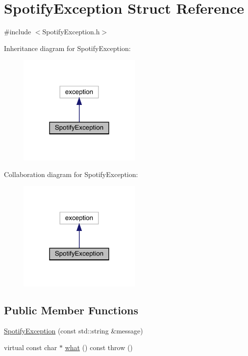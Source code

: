 \hypertarget{struct_spotify_exception}{}\section{Spotify\+Exception Struct Reference}
\label{struct_spotify_exception}


{\ttfamily \#include $<$Spotify\+Exception.\+h$>$}



Inheritance diagram for Spotify\+Exception\+:
\nopagebreak
\begin{figure}[H]
\begin{center}
\leavevmode
\includegraphics[width=170pt]{struct_spotify_exception__inherit__graph}
\end{center}
\end{figure}


Collaboration diagram for Spotify\+Exception\+:
\nopagebreak
\begin{figure}[H]
\begin{center}
\leavevmode
\includegraphics[width=170pt]{struct_spotify_exception__coll__graph}
\end{center}
\end{figure}
\subsection*{Public Member Functions}
\begin{DoxyCompactItemize}
\item 
\mbox{\hyperlink{struct_spotify_exception_a803594eb661bfdbfb34afe22a9888f94}{Spotify\+Exception}} (const std\+::string \&message)
\item 
virtual const char $\ast$ \mbox{\hyperlink{struct_spotify_exception_a1d13e0a9bd10d02f62d8c29fa9144ffd}{what}} () const  throw ()
\end{DoxyCompactItemize}
